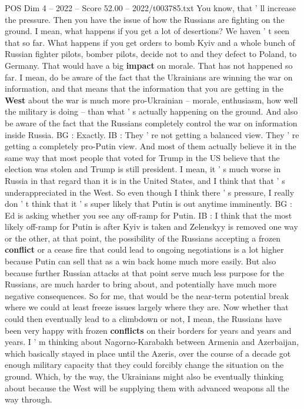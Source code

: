 \begin{textsample}{POS Dim 4 – 2022 – Score 52.00 – 2022/t003785.txt}
You know, that ' ll increase the pressure.
Then you have the issue of how the Russians are fighting on the ground.
I mean, what happens if you get a lot of desertions?
We haven ' t seen that so far.
What happens if you get orders to bomb Kyiv and a whole bunch of Russian fighter pilots, bomber pilots, decide not to and they defect to Poland, to Germany.
That would have a big \textbf{impact} on morale.
That has not happened so far.
I mean, do be aware of the fact that the Ukrainians are winning the war on information, and that means that the information that you are getting in the \textbf{West} about the war is much more pro-Ukrainian -- morale, enthusiasm, how well the military is doing -- than what ' s actually happening on the ground.
And also be aware of the fact that the Russians completely control the war on information inside Russia.
BG : Exactly.
IB : They ' re not getting a balanced view.
They ' re getting a completely pro-Putin view.
And most of them actually believe it in the same way that most people that voted for Trump in the US believe that the election was stolen and Trump is still president.
I mean, it ' s much worse in Russia in that regard than it is in the United States, and I think that that ' s underappreciated in the West.
So even though I think there ' s pressure, I really don ' t think that it ' s super likely that Putin is out anytime imminently.
BG : Ed is asking whether you see any off-ramp for Putin.
IB : I think that the most likely off-ramp for Putin is after Kyiv is taken and Zelenskyy is removed one way or the other, at that point, the possibility of the Russians accepting a frozen \textbf{conflict} or a cease fire that could lead to ongoing negotiations is a lot higher because Putin can sell that as a win back home much more easily.
But also because further Russian attacks at that point serve much less purpose for the Russians, are much harder to bring about, and potentially have much more negative consequences.
So for me, that would be the near-term potential break where we could at least freeze issues largely where they are.
Now whether that could then eventually lead to a climbdown or not, I mean, the Russians have been very happy with frozen \textbf{conflicts} on their borders for years and years and years.
I ' m thinking about Nagorno-Karabakh between Armenia and Azerbaijan, which basically stayed in place until the Azeris, over the course of a decade got enough military capacity that they could forcibly change the situation on the ground.
Which, by the way, the Ukrainians might also be eventually thinking about because the West will be supplying them with advanced weapons all the way through.

\end{textsample}
